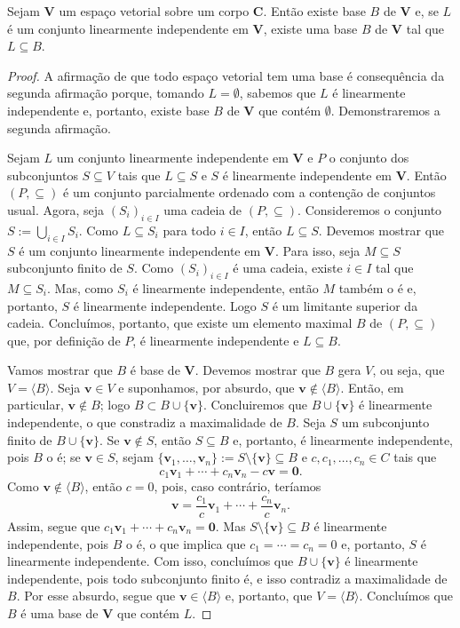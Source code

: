 \begin{theorem}
	Sejam $\bm V$ um espaço vetorial sobre um corpo $\bm C$. Então existe base $B$ de $\bm V$ e, se $L$  é um conjunto linearmente independente em $\bm V$, existe uma base $B$ de $\bm V$ tal que $L \subseteq B$.
\end{theorem}
\begin{proof}
	A afirmação de que todo espaço vetorial tem uma base é consequência da segunda afirmação porque, tomando $L=\emptyset$, sabemos que $L$ é linearmente independente e, portanto, existe base $B$ de $\bm V$ que contém $\emptyset$. Demonstraremos a segunda afirmação.

	Sejam $L$ um conjunto linearmente independente em $\bm V$ e $P$ o conjunto dos subconjuntos $S \subseteq V$ tais que $L \subseteq S$ e $S$ é linearmente independente em $\bm V$. Então $(P,\subseteq)$ é um conjunto parcialmente ordenado com a contenção de conjuntos usual. Agora, seja $(S_i)_{i \in I}$ uma cadeia de $(P,\subseteq)$. Consideremos o conjunto $S := \bigcup_{i \in I} S_i$. Como $L \subseteq S_i$ para todo $i \in I$, então $L \subseteq S$. Devemos mostrar que $S$ é um conjunto linearmente independente em $\bm V$. Para isso, seja $M \subseteq S$ subconjunto finito de $S$. Como $(S_i)_{i \in I}$ é uma cadeia, existe $i \in I$ tal que $M \subseteq S_i$. Mas, como $S_i$ é linearmente independente, então $M$ também o é e, portanto, $S$ é linearmente independente. Logo $S$ é um limitante superior da cadeia. Concluímos, portanto, que existe um elemento maximal $B$ de $(P,\subseteq)$ que, por definição de $P$, é linearmente independente e $L \subseteq B$.

	Vamos mostrar que $B$ é base de $\bm V$. Devemos mostrar que $B$ gera $V$, ou seja, que $V=\langle B \rangle$.
Seja $\bm v \in V$ e suponhamos, por absurdo, que $\bm v \notin \langle B \rangle$. Então, em particular, $\bm v \notin B$; logo $B \subset B \cup \{\bm v\}$. Concluiremos que $B \cup \{\bm v\}$ é linearmente independente, o que constradiz a maximalidade de $B$. Seja $S$ um subconjunto finito de $B \cup \{\bm v\}$. Se $\bm v \notin S$, então $S \subseteq B$ e, portanto, é linearmente independente, pois $B$ o é; se $\bm v \in S$, sejam $\{\bm v_1,\ldots,\bm v_n\} := S \setminus \{\bm v\} \subseteq B$ e $c,c_1,\ldots,c_n \in C$ tais que
	\begin{equation*}
	c_1\bm v_1 + \cdots + c_n\bm v_n -c\bm v=\bm 0.
	\end{equation*}
Como $\bm v \notin \langle B \rangle$, então $c=0$, pois, caso contrário, teríamos
	\begin{equation*}
	\bm v=\frac{c_1}{c}\bm v_1 + \cdots + \frac{c_n}{c}\bm v_n.
	\end{equation*}
Assim, segue que $c_1\bm v_1 + \cdots + c_n\bm v_n=\bm 0$. Mas $S \setminus \{\bm v\} \subseteq B$ é linearmente independente, pois $B$ o é, o que implica que $c_1=\cdots=c_n=0$ e, portanto, $S$ é linearmente independente. Com isso, concluímos que $B \cup \{\bm v\}$ é linearmente independente, pois todo subconjunto finito é, e isso contradiz a maximalidade de $B$. Por esse absurdo, segue que $\bm v \in \langle B \rangle$ e, portanto, que $V=\langle B \rangle$. Concluímos que $B$ é uma base de $\bm V$ que contém $L$.
\end{proof}


